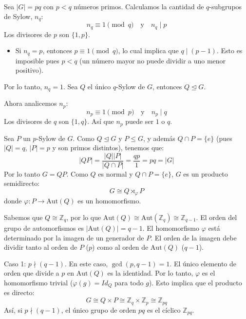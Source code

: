 \begin{eje}
    Sea $|G| = pq$ con $p < q$ números primos.
    Calculamos la cantidad de $q$-subgrupos de Sylow, $n_q$:
    \begin{equation*}
        n_q \equiv 1 \pmod q \quad \text{y} \quad n_q \mid p
    \end{equation*}
    Los divisores de $p$ son $\{1, p\}$.
    \begin{itemize}
        \item Si $n_q = p$, entonces $p \equiv 1 \pmod q$, lo cual implica que $q \mid (p-1)$. Esto es imposible pues $p < q$ (un número mayor no puede dividir a uno menor positivo).
    \end{itemize}
    Por lo tanto, $n_q = 1$.
    Sea $Q$ el único $q$-Sylow de $G$, entonces $Q \trianglelefteq G$.

    Ahora analicemos $n_p$:
    \begin{equation*}
        n_p \equiv 1 \pmod p \quad \text{y} \quad n_p \mid q
    \end{equation*}
    Los divisores de $q$ son $\{1, q\}$. Así que $n_p$ puede ser $1$ o $q$.
    
    Sea $P$ un $p$-Sylow de $G$. Como $Q \trianglelefteq G$ y $P \le G$, y además $Q \cap P = \{e\}$ (pues $|Q|=q$, $|P|=p$ y son primos distintos), tenemos que:
    \begin{equation*}
        |QP| = \frac{|Q||P|}{|Q \cap P|} = \frac{qp}{1} = pq = |G|
    \end{equation*}
    Por lo tanto $G = QP$. Como $Q$ es normal y $Q \cap P = \{e\}$, $G$ es un producto semidirecto:
    \begin{equation*}
        G \cong Q \rtimes_\varphi P
    \end{equation*}
    donde $\varphi: P \to \text{Aut}(Q)$ es un homomorfismo.
    
    Sabemos que $Q \cong \mathbb{Z}_q$, por lo que $\text{Aut}(Q) \cong \text{Aut}(\mathbb{Z}_q) \cong \mathbb{Z}_{q-1}$.
    El orden del grupo de automorfismos es $|\text{Aut}(Q)| = q-1$.
    El homomorfismo $\varphi$ está determinado por la imagen de un generador de $P$. El orden de la imagen debe dividir tanto al orden de $P$ ($p$) como al orden de $\text{Aut}(Q)$ ($q-1$).
    
    Caso 1: $p \nmid (q-1)$.
    En este caso, $\gcd(p, q-1) = 1$. El único elemento de orden que divide a $p$ en $\text{Aut}(Q)$ es la identidad.
    Por lo tanto, $\varphi$ es el homomorfismo trivial ($\varphi(g) = Id_Q$ para todo $g$).
    Esto implica que el producto es directo:
    \begin{equation*}
        G \cong Q \times P \cong \mathbb{Z}_q \times \mathbb{Z}_p \cong \mathbb{Z}_{pq}
    \end{equation*}
    Así, si $p \nmid (q-1)$, el único grupo de orden $pq$ es el cíclico $\mathbb{Z}_{pq}$.
    

\end{eje}
